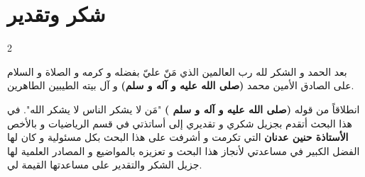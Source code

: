 \chapter*{شكر وتقدير}
\begin{spacing}{2}
	\begin{center}
		\amirifont
		بعد الحمد و الشكر لله رب العالمين الذي مَنّ عليّ بفضله و كرمه و الصلاة و السلام على الصادق الأمين محمد \textbf{(صلى الله عليه و آله و سلم)} و آل بيته الطيبين الطاهرين.
		
		​انطلاقاً من قوله \textbf{(صلى الله عليه و آله و سلم )} "مَن لا يشكر الناس لا يشكر الله". في هذا البحث أتقدم بجزيل شكري و تقديري إلى أساتذتي في قسم الرياضيات و بالأخص \textbf{الأستاذة حنين عدنان} التي تكرمت و أشرفت على هذا البحث بكل مسئولية و كان لها الفضل الكبير في مساعدتي لأنجاز هذا البحث و تعزيزه بالمواضيع و المصادر العلمية لها جزيل الشكر والتقدير على مساعدتها القيمة لي.
\end{center}
\end{spacing}
